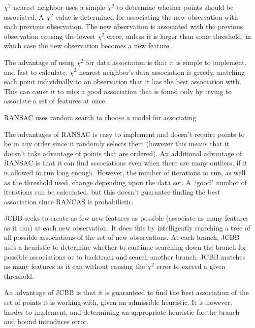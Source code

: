 \documentclass[12pt]{article}
\begin{document}
	$\chi^2$ nearest neighbor uses a simple $\chi^2$ to determine whether points
should be associated.  A $\chi^2$ value is determined for associating the new observation
with each previous observation.  The new observation is associated with the previous
observation causing the lowest $\chi^2$ error, unless it is larger than some threshold,
in which case the new observation becomes a new feature.  

	The advantage of using $\chi^2$ for data association is that it is simple to implement.
and fast to calculate.  $\chi^2$ nearest neighbor's data association is greedy, matching 
each point individually to an observation that it has the best association with.  This can 
cause it to miss a good association that is found only by trying to associate a set of features
 at once.

	RANSAC uses random search to choose a model for associating
	
	The advantages of RANSAC is easy to implement and doesn't require points to 
be in any order since it randomly selects them (however this means that it doesn't take
advantage of points that are ordered).  An additional advantage of RANSAC is that it 
can find associations even when there are many outliers, if it is allowed to run long enough.  
However, the number of iterations to run, as well as the threshold used, change depending
upon the data set.  A ``good" number of iterations can be calculated, but this doesn't 
guarantee finding the best association since RANCAS is probabilistic. 

	JCBB seeks to create as few new features as possible (associate as many features
as it can) at each new observation.  It does this by intelligently searching a tree of all
possible associations of the set of new observations.  At each branch, JCBB uses a
heuristic to determine whether to continue searching down the branch for possible
associations or to backtrack and search another branch.  JCBB matches as many features
as it can without causing the $\chi^2$ error to exceed a given threshold.

	An advantage of JCBB is that it is guaranteed to find the best association of the
set of points it is working with, given an admissible heuristic.  It is however, harder to
implement, and determining an appropriate heuristic for the branch and bound introduces
error.
\end{document}
